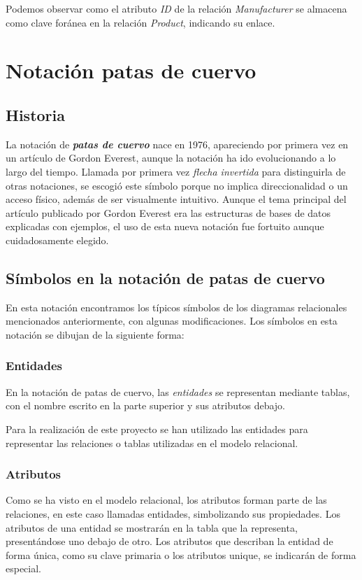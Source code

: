 Podemos observar como el atributo \textit{ID} de la relación \textit{Manufacturer} se almacena como clave foránea en la relación \emph{Product}, indicando su enlace.


\section{Notación patas de cuervo}
\subsection{Historia}
La notación de \textbf{\textit{patas de cuervo}} nace en 1976, apareciendo por primera vez en un artículo de Gordon Everest\cite{ge-bdsm}, aunque la notación ha ido evolucionando a lo largo del tiempo. Llamada por primera vez \emph{flecha invertida} para distinguirla de otras notaciones, se escogió este símbolo porque no implica direccionalidad o un acceso físico, además de ser visualmente intuitivo\cite{vert:crowsfoot}. Aunque el tema principal del artículo publicado por Gordon Everest era las estructuras de bases de datos explicadas con ejemplos, el uso de esta nueva notación fue fortuito aunque cuidadosamente elegido.

\subsection{Símbolos en la notación de patas de cuervo}
En esta notación encontramos los típicos símbolos de los diagramas relacionales mencionados anteriormente, con algunas modificaciones.
Los símbolos en esta notación se dibujan de la siguiente forma:
\subsubsection{Entidades}
En la notación de patas de cuervo, las \emph{entidades} se representan mediante tablas, con el nombre escrito en la parte superior y sus atributos debajo.

Para la realización de este proyecto se han utilizado las entidades para representar las relaciones o tablas utilizadas en el modelo relacional.

\subsubsection{Atributos}
Como se ha visto en el modelo relacional, los atributos forman parte de las relaciones, en este caso llamadas entidades, simbolizando sus propiedades. Los atributos de una entidad se mostrarán en la tabla que la representa, presentándose uno debajo de otro. Los atributos que describan la entidad de forma única, como su clave primaria o los atributos unique, se indicarán de forma especial.

